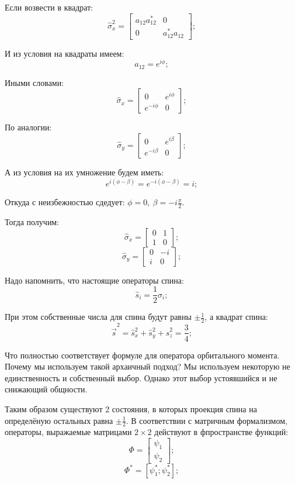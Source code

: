 \documentclass[a4paper, 14pt, russian]{article}
\newcommand{\be}{\begin{equation}}
\newcommand{\ee}{\end{equation}}
\begin{document}
	Если возвести в квадрат:
	\be
		\hat{\sigma}_x^2 = 
			\begin{bmatrix}
				a_{12} a_{12}^{*}	&	0\\
				0	&	a_{12}^{*} a_{12}
			\end{bmatrix};
	\ee

	И из условия на квадраты имеем:
	\be
			a_{12} = e^{i\phi};
	\ee

	Иными словами:
	\be
		\hat{\sigma}_x = 
			\begin{bmatrix}
				0	&	e^{i\phi}\\
				e^{-i\phi}	&	0
			\end{bmatrix};
	\ee

	По аналогии:
	\be
		\hat{\sigma}_y = 
			\begin{bmatrix}
				0	&	e^{i\beta}\\
				e^{-i\beta}	&	0
			\end{bmatrix};
	\ee

	А из условия на их умножение будем иметь:
	\be
		e^{i(\phi - \beta)} = e^{-i(\phi - \beta)} = i;
	\ee

	Откуда с неизбежностью сдедует: $\phi = 0,~\beta = -i\frac{\pi}{2}$.
	
	Тогда получим:
	\be
		\hat{\sigma}_x = 
			\begin{bmatrix}
				0	&	1\\
				1	&	0
			\end{bmatrix};
	\ee
	\be
		\hat{\sigma}_y = 
			\begin{bmatrix}
				0	&	-i\\
				i	&	0
			\end{bmatrix};
	\ee

	Надо напомнить, что настоящие операторы спина:
	\be
		\hat{s}_i = \frac{1}{2} \hat{\sigma}_i;	
	\ee

	При этом собственные числа для спина будут равны $\pm \frac{1}{2}$,
	а квадрат спина:
	\be
		\hat{\vec s}^2 = \hat{s}_x^2 + \hat{s}_y^2 + \hat{s}_z^2 = \frac{3}{4};
	\ee

	Что полностью соответствует формуле для оператора орбитального момента. Почему
	мы используем такой архаичный подход? Мы используем некоторую не единственность 
	и собственный выбор. Однако этот выбор устоявшийся и не снижающий общности.

	Таким образом существуют 2 состояния, в которых проекция спина на определёную 
	остальных равна $\pm \frac{1}{2}$. В соответствии с матричным формализмом,
	операторы, выражаемые матрицами $2 \times 2$ действуют в фпространстве функций:
	\be
		\Phi = \begin{bmatrix} \psi_1 \\ \psi_2 \end{bmatrix};
	\ee
	\be
		\Phi^{*} = [ \psi_1^{*} ; \psi_2^{*} ];
	\ee
\end{document}
